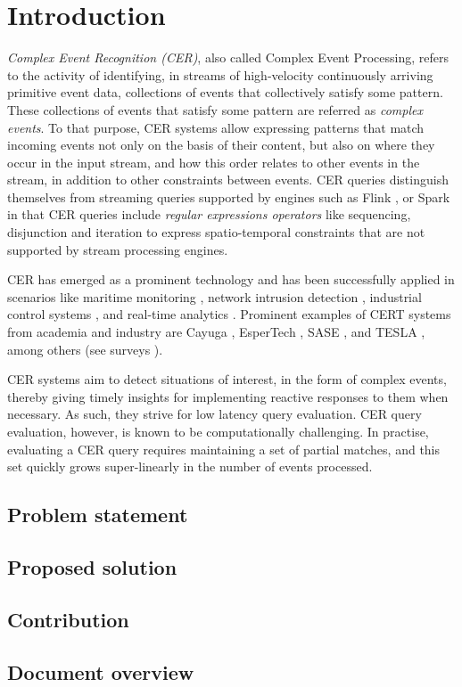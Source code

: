 \chapter{Introduction}\label{chapter:introduction}

\emph{Complex Event Recognition (CER)}, also called Complex Event Processing, refers to the activity of identifying, in streams of high-velocity continuously arriving primitive event data, collections of events that collectively satisfy some pattern.
These collections of events that satisfy some pattern are referred as \emph{complex events}. To that purpose, CER systems allow expressing patterns that match incoming events not only on the basis of their content, but also on where they occur in the input stream, and how this order relates to other events in the stream, in addition to other constraints between events. CER queries distinguish themselves from streaming queries supported by engines such as Flink \cite{flink}, or Spark \cite{spark} in that CER queries include \emph{regular expressions operators} like sequencing, disjunction and iteration to express spatio-temporal constraints that are not supported by stream processing engines.

CER has emerged as a prominent technology and has been successfully applied in scenarios like maritime monitoring \cite{maritime-monitoring}, network intrusion detection \cite{network-intrusion}, industrial control systems \cite{industrial-control}, and real-time analytics \cite{real-time-analytics}. Prominent examples of CERT systems from academia and industry are Cayuga \cite{cayuga}, EsperTech \cite{espertech}, SASE \cite{sase}, and TESLA \cite{tesla}, among others (see surveys \cite{survey-systems-1,survey-systems-2}).

CER systems aim to detect situations of interest, in the form of complex events, thereby giving timely insights for implementing reactive responses to them when necessary. As such, they strive for low latency query evaluation. CER query evaluation, however, is known to be computationally challenging. In practise, evaluating a CER query requires maintaining a set of partial matches, and this set quickly grows super-linearly in the number of events processed.

\section{Problem statement}
\label{sec:problem_statement}

\section{Proposed solution}
\label{sec:proposed_solution}

\section{Contribution}
\label{sec:contribution}

\section{Document overview}
\label{sec:document_overview}
